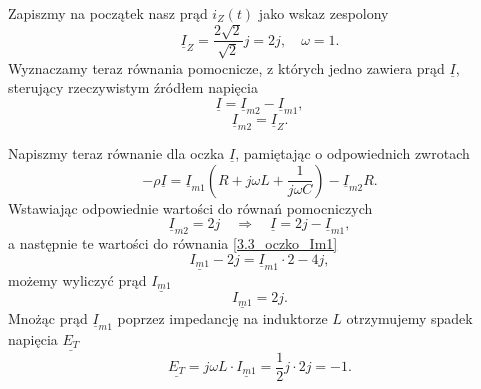 \documentclass[12pt, a4paper]{article}
\begin{document}
Zapiszmy na początek nasz prąd $i_Z(t)$ jako wskaz zespolony
\begin{equation*}
  \underline{I}_Z = \frac{2\sqrt{2}}{\sqrt{2}}j = 2j, \quad \omega = 1.
\end{equation*}
Wyznaczamy teraz równania pomocnicze, z których jedno zawiera prąd $\underline{I}$,
sterujący rzeczywistym źródłem napięcia
\begin{equation*}
  \underline{I} = \underline{I}_{m2} - \underline{I}_{m1},
\end{equation*}
\begin{equation*}
  \underline{I}_{m2} = \underline{I}_Z.
\end{equation*}

Napiszmy teraz równanie dla oczka $\underline{I}$, pamiętając o odpowiednich zwrotach
\begin{equation}\label{3.3_oczko_Im1}
  -\rho\underline{I} = \underline{I}_{m1}\left(R+j\omega L+\frac{1}{j\omega C}\right)
  - \underline{I}_{m2} R.
\end{equation}
Wstawiając odpowiednie wartości do równań pomocniczych
\begin{equation*}
  \underline{I}_{m2} = 2j \quad \Rightarrow \quad \underline{I} = 2j - \underline{I}_{m1},
\end{equation*}
a następnie te wartości do równania \ref{3.3_oczko_Im1}
\begin{equation*}
  \underline{I_{m1}} - 2j = \underline{I}_{m1} \cdot 2 - 4j,
\end{equation*}
możemy wyliczyć prąd $\underline{I_{m1}}$
\begin{equation*}
  \underline{I_{m1}} = 2j.
\end{equation*}
Mnożąc prąd $\underline{I}_{m1}$ poprzez impedancję na induktorze $L$ otrzymujemy
spadek napięcia $\underline{E_T}$
\begin{equation*}
  \underline{E_T} = j\omega L\cdot\underline{I_{m1}} = \frac{1}{2}j\cdot 2j = -1.
\end{equation*}
\end{document}
